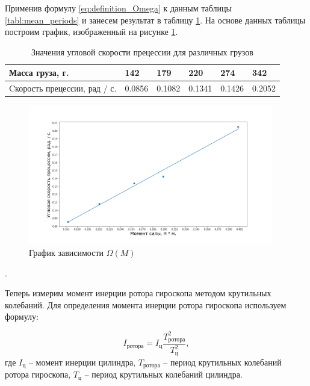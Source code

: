 \documentclass[a4paper, 12pt]{article}
\newcounter{Points}
\newcommand{\point}{\arabic{Points}. \addtocounter{Points}{1}}
\begin{document}
Применив формулу \ref{eq:definition_Omega} к данным таблицы \ref{tabl:mean_periods} и занесем результат в таблицу \ref{tabl:first_experimental_Omega}. На основе данных таблицы построим график, изображенный на рисунке \ref{fig:graphic_Omega_moment}.

\begin{table}
    \centering
    \begin{tabular}{|l|l|l|l|l|l|}
    \hline
    Масса груза, г. & 142 & 179 & 220 & 274 & 342 \\ \hline
    Cкорость прецессии, рад / с. & 0.0856 & 0.1082 & 0.1341 & 0.1426 & 0.2052 \\ \hline
    \end{tabular}
	\caption{Значения угловой скорости прецессии для различных грузов}
    \label{tabl:first_experimental_Omega}
\end{table}

\begin{figure}[h!]
	\begin{center}
		\includegraphics[width = 0.95\textwidth]{Omega-ForceMoment.png}
		\caption{График зависимости $\Omega(M)$}
		\label{fig:graphic_Omega_moment}
	\end{center}
\end{figure}

\point Теперь измерим момент инерции ротора гироскопа методом крутильных колебаний. Для определения момента инерции ротора гироскопа используем формулу:

\begin{equation}
	I_{\text{ротора}}= I_{\text{ц}}\frac{T_{\text{ротора}}^2}{T_{\text{ц}}^2},
	\label{eq:moment_measuring_equation}
\end{equation}
где $I_{\text{ц}}$ -- момент инерции цилиндра, $T_{\text{ротора}}$ -- период крутильных колебаний ротора гироскопа, $T_{\text{ц}}$ -- период крутильных колебаний цилиндра.
\end{document}

